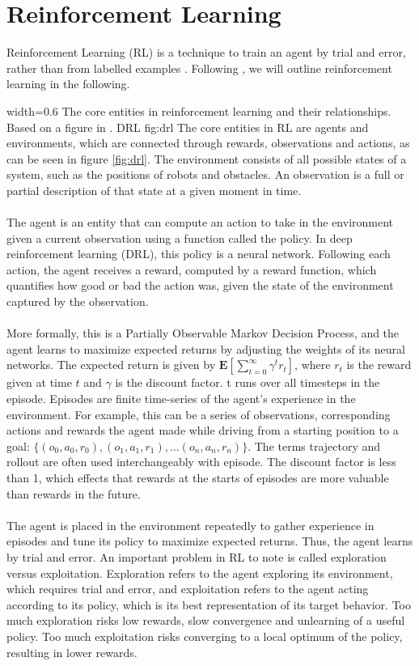 \section{Reinforcement Learning}
Reinforcement Learning (RL) is a technique to train an agent by trial and error, rather than from labelled examples \citep{lapan}. Following \citep{lapan}, we will outline reinforcement learning in the following.

 {width=0.6\textwidth}%
 {The core entities in reinforcement learning and their relationships. Based on a figure in \citep{lapan}.}%
 {DRL}%
 {fig:drl}%
 \FloatBarrier
\noindent The core entities in RL are agents and environments, which are connected through rewards, observations and actions, as can be seen in figure \ref{fig:drl}. The environment consists of all possible states of a system, such as the positions of robots and obstacles. An observation is a full or partial description of that state at a given moment in time.
\\\\\noindent 
The agent is an entity that can compute an action to take in the environment given a current observation using a function called the policy. In deep reinforcement learning (DRL), this policy is a neural network.
Following each action, the agent receives a reward, computed by a reward function, which quantifies how good or bad the action was, given the state of the environment captured by the observation.
\\\\\noindent 
More formally, this is a Partially Observable Markov Decision Process, and the agent learns to maximize expected returns by adjusting the weights of its neural networks.
The expected return is given by $\mathbf{E}[\sum_{t=0}^{\infty}\gamma^{t}r_{t}]$, where $r_{t}$ is the reward given at time $t$ and $\gamma$ is the discount factor.
t runs over all timesteps in the episode. Episodes are finite time-series of the agent’s experience in the environment. For example, this can be a series of observations, corresponding actions and rewards the agent made while driving from a starting position to a goal: $\{(o_0, a_0, r_0), (o_1, a_1, r_1), … (o_n, a_n, r_n)\}$. The terms trajectory and rollout are often used interchangeably with episode.
The discount factor is less than 1, which effects that rewards at the starts of episodes are more valuable than rewards in the future.
\\\\\noindent 
The agent is placed in the environment repeatedly to gather experience in episodes and tune its policy to maximize expected returns. Thus, the agent learns by trial and error.
An important problem in RL to note is called exploration versus exploitation. Exploration refers to the agent exploring its environment, which requires trial and error, and exploitation refers to the agent acting according to its policy, which is its best representation of its target behavior. Too much exploration risks low rewards, slow convergence and unlearning of a useful policy. Too much exploitation risks converging to a local optimum of the policy, resulting in lower rewards.
